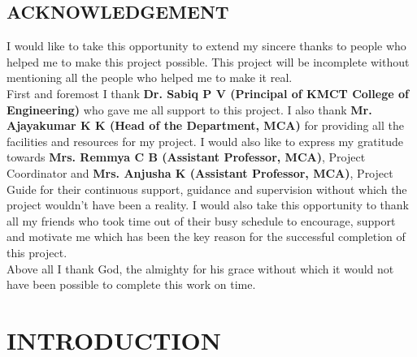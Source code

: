 \documentclass[a4paper,12pt,toc=flat]{report}
\begin{document}
	\section*{\centering \bf \large ACKNOWLEDGEMENT}
	
	
	\vspace*{20pt}I would like to take this opportunity to extend my sincere thanks to people who helped me to make
	this project possible. This project will be incomplete without mentioning all the people who helped
	me to make it real.\\
	
	\hspace{12pt}First and foremost I thank {\bf Dr. Sabiq P V (Principal of KMCT College of Engineering)} who
	gave me all support to this project. I also thank {\bf Mr. Ajayakumar K K (Head of the Department,
		MCA)} for providing all the facilities and resources for my project. I would also like to express my
	gratitude towards {\bf Mrs. Remmya C B (Assistant Professor, MCA)}, Project Coordinator and  {\bf Mrs. Anjusha K (Assistant Professor, MCA)}, Project Guide for their
	continuous support, guidance and supervision without which the project wouldn’t have been a
	reality.  I would also take this
	opportunity to thank all my friends who took time out of their busy schedule to encourage, support
	and motivate me which has been the key reason for the successful completion of this project.\\ 
	
	Above all I thank God, the almighty for his grace without which it would not have been
	possible to complete this work on time.	
	
	
	
	\pagebreak
	\tableofcontents{}
	\pagebreak
		\chapter{INTRODUCTION}
	
\end{document}
